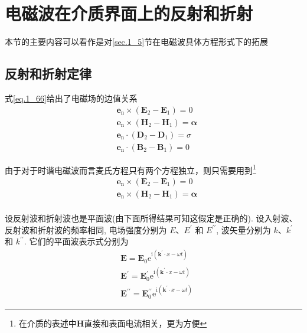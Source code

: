 \section{电磁波在介质界面上的反射和折射}
    本节的主要内容可以看作是对\ref{sec.1_5}节在电磁波具体方程形式下的拓展
    \subsection{反射和折射定律}
        式\ref{eq.1_66}给出了电磁场的边值关系
        \begin{equation}
            \begin{aligned}
            &\boldsymbol{e}_{\mathrm{n}} \times\left(\boldsymbol{E}_{2}-\boldsymbol{E}_{1}\right)=0 \\
            &\boldsymbol{e}_{\mathrm{n}} \times\left(\boldsymbol{H}_{2}-\boldsymbol{H}_{1}\right)=\boldsymbol{\alpha} \\
            &\boldsymbol{e}_{\mathrm{n}} \cdot\left(\boldsymbol{D}_{2}-\boldsymbol{D}_{1}\right)=\sigma \\
            &\boldsymbol{e}_{\mathrm{n}} \cdot\left(\boldsymbol{B}_{2}-\boldsymbol{B}_{1}\right)=0
            \end{aligned}
        \end{equation}
        
        由于对于时谐电磁波而言麦氏方程只有两个方程独立，则只需要用到\footnote{在介质的表述中$\boldsymbol{H}$直接和表面电流相关，更为方便}
        \begin{equation}
            \label{eq.4_28}
            \begin{aligned}
            &\boldsymbol{e}_{\mathrm{n}} \times\left(\boldsymbol{E}_{2}-\boldsymbol{E}_{1}\right)=0 \\
            &\boldsymbol{e}_{\mathrm{n}} \times\left(\boldsymbol{H}_{2}-\boldsymbol{H}_{1}\right)=\boldsymbol{\alpha} \\
            \end{aligned}
        \end{equation}

        设反射波和折射波也是平面波(由下面所得结果可知这假定是正确的). 设入射波、反射波和折射波的频率相同, 电场强度分别为 $E 、 E^{\prime}$ 和 $E^{\prime \prime}$, 波矢量分别为 $k 、 k^{\prime}$ 和 $k^{\prime \prime}$. 它们的平面波表示式分别为
        \[
        \begin{aligned}
        &\boldsymbol{E}=\boldsymbol{E}_{0} \mathrm{e}^{\mathrm{i}\left(\boldsymbol{k}^{\prime} \cdot x-\omega t\right)} \\
        &\boldsymbol{E}^{\prime}=\boldsymbol{E}_{0}^{\prime} \mathrm{e}^{\mathrm{i}\left(\boldsymbol{k}^{\prime} \cdot x-\omega t\right)} \\
        &\boldsymbol{E}^{\prime \prime}=\boldsymbol{E}_{0}^{\prime \prime} \mathrm{e}^{\mathrm{i}\left(\boldsymbol{k}^{\prime} \cdot x-\omega t\right)}
        \end{aligned}
        \]

